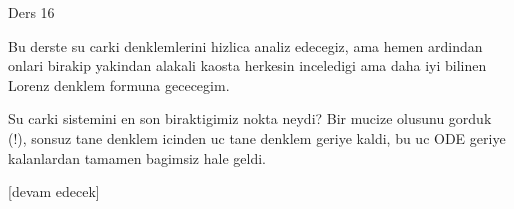 \documentclass[12pt,fleqn]{article}\usepackage{../../common}
\begin{document}
Ders 16

Bu derste su carki denklemlerini hizlica analiz edecegiz, ama hemen
ardindan onlari birakip yakindan alakali kaosta herkesin inceledigi ama
daha iyi bilinen Lorenz denklem formuna gececegim.

Su carki sistemini en son biraktigimiz nokta neydi? Bir mucize olusunu
gorduk (!), sonsuz tane denklem icinden uc tane denklem geriye kaldi, bu uc
ODE geriye kalanlardan tamamen bagimsiz hale geldi. 

















[devam edecek]
\end{document}
